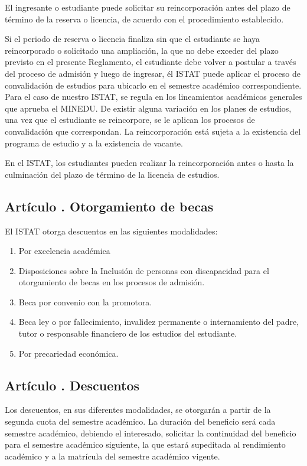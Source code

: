 El ingresante o estudiante puede solicitar su reincorporación antes del plazo de término de la reserva o licencia, de acuerdo con el procedimiento establecido.

Si el periodo de reserva o licencia finaliza sin que el estudiante se haya reincorporado o solicitado una ampliación, la que no debe exceder del plazo previsto en el presente Reglamento, el estudiante debe volver a postular a través del proceso de admisión y luego de ingresar, él ISTAT puede aplicar el proceso de convalidación de estudios para ubicarlo en el semestre académico correspondiente. Para el caso de nuestro ISTAT, se regula en los lineamientos académicos generales que aprueba el MINEDU. De existir alguna variación en los planes de estudios, una vez que el estudiante se reincorpore, se le aplican los procesos de convalidación que correspondan. La reincorporación está sujeta a la existencia del programa de estudio y a la existencia de vacante.

En el ISTAT, los estudiantes pueden realizar la reincorporación antes o hasta la culminación del plazo de término de la licencia de estudios.
\subsection{Artículo . Otorgamiento de becas}
\addtocounter{ns}{1}
El ISTAT otorga descuentos en las siguientes modalidades:
\begin{enumerate}
\item Por excelencia académica  
\item Disposiciones   sobre   la   Inclusión   de personas con discapacidad para el otorgamiento de becas en los procesos de admisión.
\item Beca por convenio con la promotora. 
\item Beca ley o por fallecimiento, invalidez permanente o internamiento del padre, tutor o responsable financiero de los estudios del estudiante. 
\item Por precariedad económica. 
\end{enumerate}
\subsection{Artículo . Descuentos}
\addtocounter{ns}{1}
Los descuentos, en sus diferentes modalidades, se otorgarán a partir de la segunda cuota del semestre académico. La duración del beneficio será cada semestre académico, debiendo el interesado, solicitar la continuidad del beneficio para el semestre académico siguiente, la que estará supeditada al rendimiento académico y a la matrícula del semestre académico vigente.
